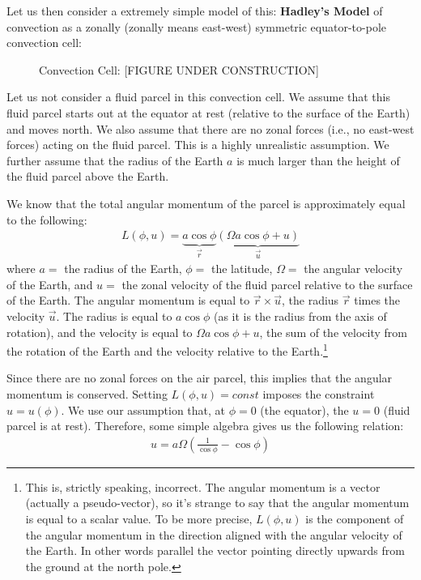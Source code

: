 Let us then consider a extremely simple model of this: \textbf{Hadley's Model} of convection as a zonally (zonally means east-west) symmetric equator-to-pole convection cell:
\begin{figure}[H]
    \centering
    \caption{Convection Cell: [FIGURE UNDER CONSTRUCTION]}
\end{figure}

Let us not consider a fluid parcel in this convection cell. We assume that this fluid parcel starts out at the equator at rest (relative to the surface of the Earth) and moves north. We also assume that there are no zonal forces (i.e., no east-west forces) acting on the fluid parcel. This is a highly unrealistic assumption. We further assume that the radius of the Earth $a$ is much larger than the height of the fluid parcel above the Earth.

We know that the total angular momentum of the parcel is approximately equal to the following:
\begin{align*}
    L(\phi,u) = \underbrace{a\cos\phi}_{\vec{r}} \underbrace{\left( \Omega a \cos \phi + u \right)}_{\vec{u}}
\end{align*}
where $a=$ the radius of the Earth, $\phi=$ the latitude, $\Omega=$ the angular velocity of the Earth, and $u=$ the zonal velocity of the fluid parcel relative to the surface of the Earth. The angular momentum is equal to $\vec{r}\times\vec{u}$, the radius $\vec{r}$ times the velocity $\vec{u}$. The radius is equal to $a\cos\phi$ (as it is the radius from the axis of rotation), and the velocity is equal to $\Omega a \cos \phi + u$, the sum of the velocity from the rotation of the Earth and the velocity relative to the Earth.\footnote{
    This is, strictly speaking, incorrect. The angular momentum is a vector (actually a pseudo-vector), so it’s strange to say that the angular momentum is equal to a scalar value. To be more precise, $L(\phi,u)$ is the component of the angular momentum in the direction aligned with the angular velocity of the Earth. In other words parallel the vector pointing directly upwards from the ground at the north pole.
}

Since there are no zonal forces on the air parcel, this implies that the angular momentum is conserved. Setting $L(\phi,u)=const$ imposes the constraint $u=u(\phi)$. We use our assumption that, at $\phi=0$ (the equator), the $u=0$ (fluid parcel is at rest). Therefore, some simple algebra gives us the following relation:
\begin{align*}
    \boxed{u=a\Omega \left( \frac{1}{\cos\phi}-\cos\phi
    \right)}
\end{align*}

